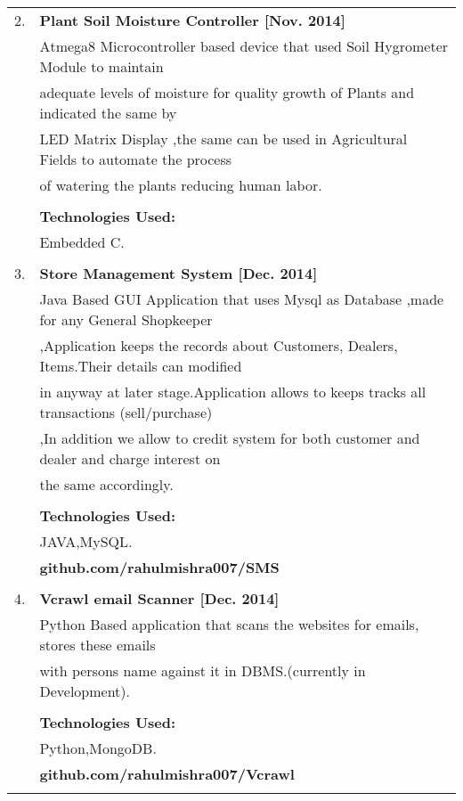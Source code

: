 \documentclass[a4paper,10pt]{article}
\begin{document}
\begin{tabular}{rl}
 \textsc{2.} & {\large\textbf{Plant Soil Moisture Controller [Nov. 2014]}}\\ & \textsc Atmega8 Microcontroller based device that used Soil Hygrometer Module to maintain \\ & adequate levels of moisture for quality growth of Plants and indicated the same by \\ & LED Matrix Display ,the same can be used in Agricultural Fields to automate the process \\ & of watering the plants reducing human labor.
 \\ & \\ &
 \normalsize\textbf{Technologies Used:}\\ & Embedded C.\\ & \\ 
 \textsc{3.} & {\large\textbf{ Store Management System [Dec. 2014]}}\\ & \textsc Java Based GUI Application that uses Mysql as Database ,made for any General Shopkeeper\\ & ,Application keeps the records about Customers, Dealers, Items.Their details can modified \\ & in anyway at later stage.Application allows to keeps tracks all transactions (sell/purchase)\\ & ,In addition we allow to credit system for both customer and dealer and charge interest on \\ & the same accordingly.\\ & \\ &
 \normalsize\textbf{Technologies Used:}\\ & JAVA,MySQL.\\ &
 \normalsize\textbf{github.com/rahulmishra007/SMS}\\ & \\ 
 \textsc{4.} & {\large\textbf{Vcrawl email Scanner [Dec. 2014]}}\\ & \textsc Python Based application that scans the websites for emails, stores these emails \\ & with persons name against it in DBMS.(currently in Development). \\ & \\ &
 \normalsize\textbf{Technologies Used:}\\ & Python,MongoDB.\\ &
 \normalsize\textbf{github.com/rahulmishra007/Vcrawl}\\ & \\

\end{tabular}
\end{document}
